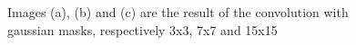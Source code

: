 \documentclass[12pt,a4paper]{article}
\begin{document}
\begin{figure}[!h]
	\centering
	\quad
	\quad
	\caption{Images (a), (b) and (c) are the result of the convolution with gaussian masks, respectively 3x3, 7x7 and 15x15}
	\label{fig:convolution}
\end{figure}
\end{document}
